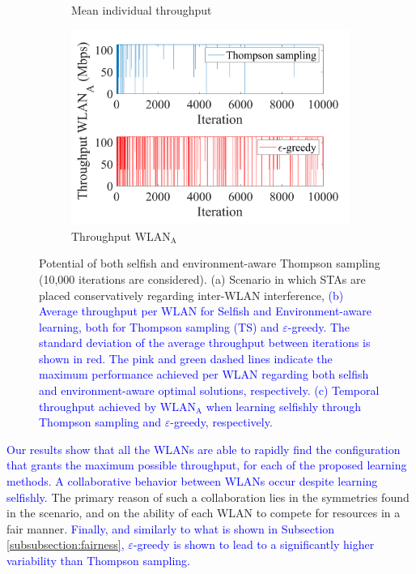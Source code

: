 \documentclass[preprint,12pt]{elsarticle}
\begin{document}
\begin{figure}[h!]
\begin{subfigure}[b]{0.36\textwidth}
		\caption{Mean individual throughput}
		\label{fig:4_grid_selfish_benefits_mean_tpt}
	\end{subfigure}
	\begin{subfigure}[b]{0.36\textwidth}
		\includegraphics[width=\textwidth]{experiment_2_2_variability}
		\caption{Throughput $\text{WLAN}_\text{A}$}
		\label{fig:experiment_2_2_variability}
	\end{subfigure}
	\caption{Potential of both selfish and environment-aware Thompson sampling (10,000 iterations are considered). (a) Scenario in which STAs are placed conservatively regarding inter-WLAN interference, \textcolor{blue}{(b) Average throughput per WLAN for Selfish and Environment-aware learning, both for Thompson sampling (TS) and $\varepsilon$-greedy. The standard deviation of the average throughput between iterations is shown in red. The pink and green dashed lines indicate the maximum performance achieved per WLAN regarding both selfish and environment-aware optimal solutions, respectively. (c) Temporal throughput achieved by $\text{WLAN}_\text{A}$ when learning selfishly through Thompson sampling and $\varepsilon$-greedy, respectively.}}
	\label{fig:4_grid_selfish_benefits}
\end{figure} 	

\textcolor{blue}{Our results show that all the WLANs are able to rapidly find the configuration that grants the maximum possible throughput, for each of the proposed learning methods. A collaborative behavior between WLANs occur despite learning selfishly.} The primary reason of such a collaboration lies in the symmetries found in the scenario, and on the ability of each WLAN to compete for resources in a fair manner. \textcolor{blue}{Finally, and similarly to what is shown in Subsection \ref{subsubsection:fairness}, $\varepsilon$-greedy is shown to lead to a significantly higher variability than Thompson sampling.}
\end{document}
